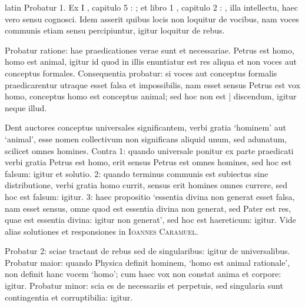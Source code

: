 \begin{otherlanguage*}{latin}
\pstart
 Probatur 1. Ex   I , capitulo 5 : ; et  libro 1 , capitulo 2 : , illa intellectu, haec vero sensu cognosci. Idem asserit  quibus locis non loquitur de vocibus, nam voces communis etiam sensu percipiuntur, igitur loquitur de rebus. 
\pend

\pstart
 Probatur ratione: hae praedicationes verae sunt et necessariae. Petrus est homo, homo est animal, igitur id quod in illis enuntiatur est res aliqua et non voces aut conceptus formales. Consequentia probatur: si voces aut conceptus formalis praedicarentur utraque esset falsa et impossibilis, nam esset sensus Petrus est vox homo, conceptus homo est conceptus animal; sed hoc non est \textnormal{|} discendum, igitur neque illud. 
\pend

\pstart
 Dent auctores conceptus universales significantem, verbi gratia `hominem' aut `animal', esse nomen collectivum non significans aliquid unum, sed adunatum, scilicet omnes homines. Contra 1: quando universale ponitur ex parte praedicati verbi gratia Petrus est homo, erit sensus Petrus est omnes homines, sed hoc est falsum: igitur et solutio.  2: quando terminus communis est subiectus sine distributione, verbi gratia homo currit, sensus erit homines omnes currere, sed hoc est falsum: igitur.  3: haec propositio `essentia divina non generat esset falsa, nam esset sensus, omne quod est essentia divina non generat, sed Pater est res, quae est essentia divina: igitur non generat', sed hoc est haereticum: igitur. Vide alias solutiones et responsiones in \textsc{Ioannes Caramuel}. 
\pend

\pstart
 Probatur 2: sciae tractant de rebus sed de singularibus: igitur de universalibus. Probatur maior: quando Physica definit hominem, `homo est animal rationale', non definit hanc vocem `homo'; cum haec vox non constat anima et corpore: igitur. Probatur minor: scia es de necessariis et perpetuis, sed singularia sunt contingentia et corruptibilia: igitur. 
\pend


\end{otherlanguage*}
